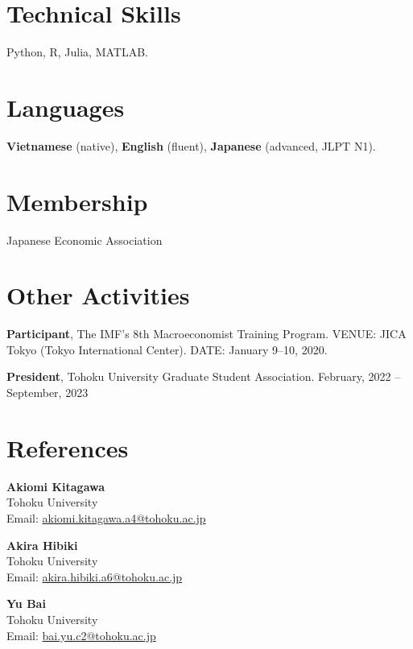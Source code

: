 \documentclass[12pt]{article}
\begin{document}
\section{Technical Skills}

Python, R, Julia, MATLAB.

\section{Languages}

\textbf{Vietnamese} (native), \textbf{English} (fluent), \textbf{Japanese} (advanced, JLPT N1).

\section{Membership}

Japanese Economic Association

\section{Other Activities}

\textbf{Participant}, The IMF's 8th Macroeconomist Training Program. VENUE: JICA Tokyo (Tokyo International Center). DATE: January 9--10, 2020.

\textbf{President}, Tohoku University Graduate Student Association. February, 2022 -- September, 2023

\section{\sc References}

	{\bf Akiomi Kitagawa}\\ 
	Tohoku University \\
	Email: \href{mailto:akiomi.kitagawa.a4@tohoku.ac.jp}{akiomi.kitagawa.a4@tohoku.ac.jp}

	\vspace{0.5em}

	{\bf Akira Hibiki} \\
	Tohoku University\\
	Email: \href{mailto:akira.hibiki.a6@tohoku.ac.jp}{akira.hibiki.a6@tohoku.ac.jp}

	\vspace{0.5em}

	{\bf Yu Bai} \\ 
	Tohoku University\\
	Email: \href{mailto:bai.yu.c2tohoku.ac.jp}{bai.yu.c2@tohoku.ac.jp}
\end{document}
